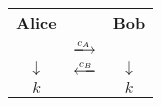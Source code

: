 \begin{tabular}{cC{1cm}c}
    \textbf{Alice} &  & \textbf{Bob}\\
    & $\xlongrightarrow{c_A}$ & \\
    $\downarrow$& $\xlongleftarrow{c_B}$ & $\downarrow$\\
    $k$ & & $k$
\end{tabular}